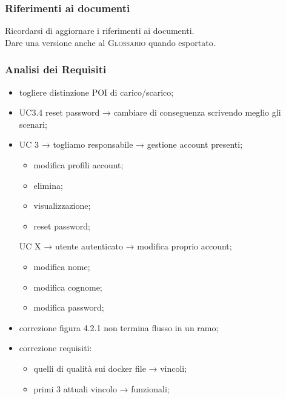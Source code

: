 \subsubsection{Riferimenti ai documenti}
Ricordarsi di aggiornare i riferimenti ai documenti.\\
Dare una versione anche al \textsc{Glossario} quando esportato.

\subsubsection{Analisi dei Requisiti}
\begin{itemize}
	\item togliere distinzione POI di carico/scarico;
	
	\item UC3.4 reset password → cambiare di conseguenza scrivendo meglio gli scenari;
	
	\item UC 3 → togliamo responsabile → gestione account presenti;
	\begin{itemize}
		\item modifica profili account;
		
		\item elimina;
		
		\item visualizzazione;
		
		\item reset password;
	\end{itemize}
	UC X → utente autenticato → modifica proprio account;
	\begin{itemize}
		\item modifica nome;
		
		\item modifica cognome;
		
		\item modifica password;
	\end{itemize}
	\item correzione figura 4.2.1 non termina flusso in un ramo;
	
	\item correzione requisiti:
	\begin{itemize}
		\item quelli di qualità sui docker file → vincoli;
		\item primi 3 attuali vincolo → funzionali;
	\end{itemize}
\end{itemize}

